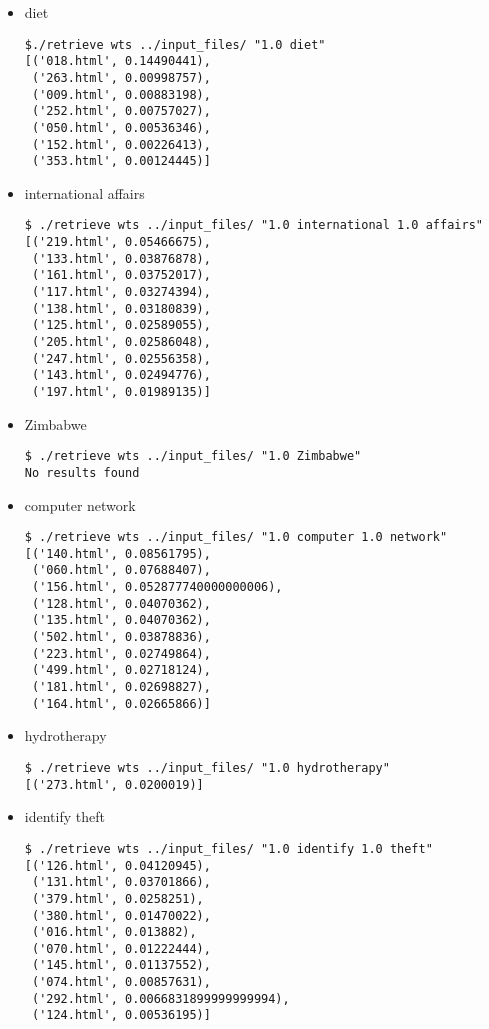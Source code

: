 \documentclass[paper=a4, fontsize=11pt]{scrartcl}
\numberwithin{equation}{section}		%
\numberwithin{figure}{section}			%
\numberwithin{table}{section}				%
\begin{document}
\begin{itemize}

\item diet \\ 

\begin{verbatim}
$./retrieve wts ../input_files/ "1.0 diet"
[('018.html', 0.14490441),
 ('263.html', 0.00998757),
 ('009.html', 0.00883198),
 ('252.html', 0.00757027),
 ('050.html', 0.00536346),
 ('152.html', 0.00226413),
 ('353.html', 0.00124445)]
\end{verbatim}

\item international affairs

\begin{verbatim}
$ ./retrieve wts ../input_files/ "1.0 international 1.0 affairs"
[('219.html', 0.05466675),
 ('133.html', 0.03876878),
 ('161.html', 0.03752017),
 ('117.html', 0.03274394),
 ('138.html', 0.03180839),
 ('125.html', 0.02589055),
 ('205.html', 0.02586048),
 ('247.html', 0.02556358),
 ('143.html', 0.02494776),
 ('197.html', 0.01989135)]
\end{verbatim}

\item Zimbabwe

\begin{verbatim}
$ ./retrieve wts ../input_files/ "1.0 Zimbabwe"
No results found
\end{verbatim}

\item computer network
\begin{verbatim}
$ ./retrieve wts ../input_files/ "1.0 computer 1.0 network"
[('140.html', 0.08561795),
 ('060.html', 0.07688407),
 ('156.html', 0.052877740000000006),
 ('128.html', 0.04070362),
 ('135.html', 0.04070362),
 ('502.html', 0.03878836),
 ('223.html', 0.02749864),
 ('499.html', 0.02718124),
 ('181.html', 0.02698827),
 ('164.html', 0.02665866)]

\end{verbatim}

\item hydrotherapy
\begin{verbatim}
$ ./retrieve wts ../input_files/ "1.0 hydrotherapy"
[('273.html', 0.0200019)]

\end{verbatim}

\item identify theft
\begin{verbatim}
$ ./retrieve wts ../input_files/ "1.0 identify 1.0 theft"
[('126.html', 0.04120945),
 ('131.html', 0.03701866),
 ('379.html', 0.0258251),
 ('380.html', 0.01470022),
 ('016.html', 0.013882),
 ('070.html', 0.01222444),
 ('145.html', 0.01137552),
 ('074.html', 0.00857631),
 ('292.html', 0.0066831899999999994),
 ('124.html', 0.00536195)]


\end{verbatim}
\end{itemize}
\end{document}
